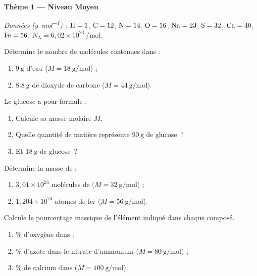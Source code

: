 \documentclass[11pt,a4paper]{article}
\begin{document}
\begin{center}{\large\bfseries\color{primarydark} Thème 1 — Niveau Moyen}\end{center}
\emph{Données (\si{\gram\per\mole}) :} $\ce{H}=1$, $\ce{C}=12$, $\ce{N}=14$, $\ce{O}=16$,
$\ce{Na}=23$, $\ce{S}=32$, $\ce{Ca}=40$, $\ce{Fe}=56$. \quad $N_{\mathrm{A}} = 6{,}02\times10^{23}\ \si{\per\mole}$.

\begin{exo}
Détermine le nombre de molécules contenues dans :
\begin{enumerate}[label=\alph*)]
  \item $\SI{9}{\gram}$ d'eau  \quad ($M=\SI{18}{\gram\per\mole}$) ;
  \item $\SI{8.8}{\gram}$ de dioxyde de carbone  \quad ($M=\SI{44}{\gram\per\mole}$).
\end{enumerate}
\end{exo}

\begin{exo}
Le glucose a pour formule .
\begin{enumerate}[label=\alph*)]
  \item Calcule sa masse molaire $M$.
  \item Quelle quantité de matière représente $\SI{90}{\gram}$ de glucose~?
  \item Et $\SI{18}{\gram}$ de glucose~?
\end{enumerate}
\end{exo}

\begin{exo}
Détermine la masse de :
\begin{enumerate}[label=\alph*)]
  \item $3{,}01\times10^{23}$ molécules de  \quad ($M=\SI{32}{\gram\per\mole}$) ;
  \item $1{,}204\times10^{24}$ atomes de fer \quad ($M=\SI{56}{\gram\per\mole}$).
\end{enumerate}
\end{exo}

\begin{exo}
Calcule le pourcentage massique de l'élément indiqué dans chaque composé.
\begin{enumerate}[label=\alph*)]
  \item \% d'oxygène dans  ;
  \item \% d'azote dans le nitrate d'ammonium  \quad ($M=\SI{80}{\gram\per\mole}$) ;
  \item \% de calcium dans  \quad ($M=\SI{100}{\gram\per\mole}$).
\end{enumerate}
\end{exo}
\end{document}
